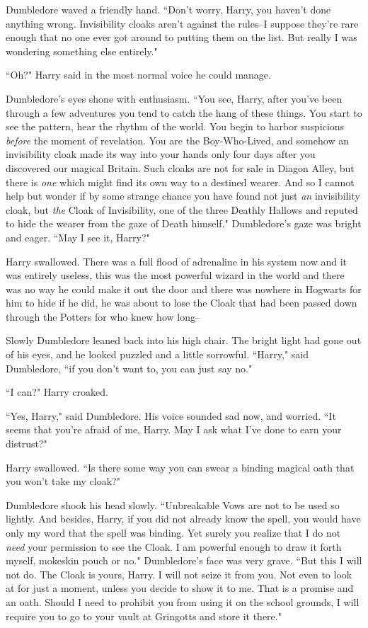 Dumbledore waved a friendly hand. ``Don't worry, Harry, you haven't done anything wrong. Invisibility cloaks aren't against the rules\---I suppose they're rare enough that no one ever got around to putting them on the list. But really I was wondering something else entirely."

``Oh?" Harry said in the most normal voice he could manage.

Dumbledore's eyes shone with enthusiasm. ``You see, Harry, after you've been through a few adventures you tend to catch the hang of these things. You start to see the pattern, hear the rhythm of the world. You begin to harbor suspicions \emph{before} the moment of revelation. You are the Boy-Who-Lived, and somehow an invisibility cloak made its way into your hands only four days after you discovered our magical Britain. Such cloaks are not for sale in Diagon Alley, but there is \emph{one} which might find its own way to a destined wearer. And so I cannot help but wonder if by some strange chance you have found not just \emph{an} invisibility cloak, but \emph{the} Cloak of Invisibility, one of the three Deathly Hallows and reputed to hide the wearer from the gaze of Death himself." Dumbledore's gaze was bright and eager. ``May I see it, Harry?"

Harry swallowed. There was a full flood of adrenaline in his system now and it was entirely useless, this was the most powerful wizard in the world and there was no way he could make it out the door and there was nowhere in Hogwarts for him to hide if he did, he was about to lose the Cloak that had been passed down through the Potters for who knew how long\---

Slowly Dumbledore leaned back into his high chair. The bright light had gone out of his eyes, and he looked puzzled and a little sorrowful. ``Harry," said Dumbledore, ``if you don't want to, you can just say no."

``I can?" Harry croaked.

``Yes, Harry," said Dumbledore. His voice sounded sad now, and worried. ``It seems that you're afraid of me, Harry. May I ask what I've done to earn your distrust?"

Harry swallowed. ``Is there some way you can swear a binding magical oath that you won't take my cloak?"

Dumbledore shook his head slowly. ``Unbreakable Vows are not to be used so lightly. And besides, Harry, if you did not already know the spell, you would have only my word that the spell was binding. Yet surely you realize that I do not \emph{need} your permission to see the Cloak. I am powerful enough to draw it forth myself, mokeskin pouch or no." Dumbledore's face was very grave. ``But this I will not do. The Cloak is yours, Harry. I will not seize it from you. Not even to look at for just a moment, unless you decide to show it to me. That is a promise and an oath. Should I need to prohibit you from using it on the school grounds, I will require you to go to your vault at Gringotts and store it there."

